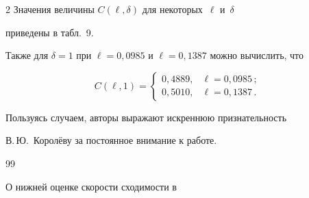 \begin{multicols}{2}
Значения величины $C(\ell,\delta)$ для некоторых~$\ell$ и~$\delta$


приведены в табл.~9.








Также для $\delta=1$ при $\ell=0{,}0985$ и $\ell=0{,}1387$ можно вычислить, что


$$


C(\ell,1)= \begin{cases}


0{,}4889,&\ell=0{,}0985\,;\\


0{,}5010,&\ell=0{,}1387\,.


\end{cases}


$$

















\bigskip





Пользуясь случаем, авторы выражают искреннюю признательность


В.\,Ю.~Королёву за постоянное внимание к работе.





{\small\frenchspacing


{%




\begin{thebibliography}{99}







 О нижней оценке скорости сходимости в



\end{thebibliography}}}
\end{multicols}
